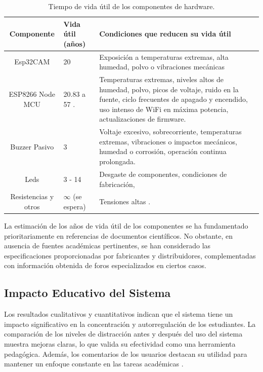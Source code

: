 \documentclass[a4paper,fleqn]{cas-sc}
\begin{document}
				\begin{table}[h]
					\centering
					\caption{Tiempo de vida útil de los componentes de hardware.}
					\label{tab:ShelfLife}
					\begin{tabularx}{\textwidth}{cXX}
						\toprule
						\textbf{Componente} & \textbf{Vida útil (años)} & Condiciones que reducen su vida útil\\
						\midrule
						Esp32CAM & 20 \citep{Espressif2022ESP32-CAM,Espressif2022ESP32Forum} & Exposición a temperaturas extremas, alta humedad, polvo o vibraciones mecánicas\\
						ESP8266 Node MCU & 20.83 \citep{Amri2018Improving} a 57 \citep{Ardumotica2023,Espressif2022ESP32Forum}. & Temperaturas extremas, niveles altos de humedad, polvo, picos de voltaje, ruido en la fuente, ciclo frecuentes de apagado y encendido, uso intenso de WiFi en máxima potencia, actualizaciones de firmware.\\
						Buzzer Pasivo & 3 \citep{HuawhaElectronics} & Voltaje excesivo, sobrecorriente, temperaturas extremas, vibraciones o impactos mecánicos, humedad o corrosión, operación continua prolongada. \\
						Leds & 3 \citep{Casamayor2015} - 14 \citep{Cary,GreenLighting2024} & Desgaste de componentes, condiciones de fabricación, \\
						Resistencias y otros & $\infty$ (se espera) & Tensiones altas \citep{Simon2017Evolution}. \\
						\bottomrule
					\end{tabularx}
				\end{table}
				La estimación de los años de vida útil de los componentes se ha fundamentado prioritariamente en referencias de documentos científicos. No obstante, en ausencia de fuentes académicas pertinentes, se han considerado las especificaciones proporcionadas por fabricantes y distribuidores, complementadas con información obtenida de foros especializados en ciertos casos.
		
		\subsection{Impacto Educativo del Sistema}
			Los resultados cualitativos y cuantitativos indican que el sistema tiene un impacto significativo en la concentración y autorregulación de los estudiantes. La comparación de los niveles de distracción antes y después del uso del sistema muestra mejoras claras, lo que valida su efectividad como una herramienta pedagógica. Además, los comentarios de los usuarios destacan su utilidad para mantener un enfoque constante en las tareas académicas \citep{Leiss2024Students}.
			
\end{document}
